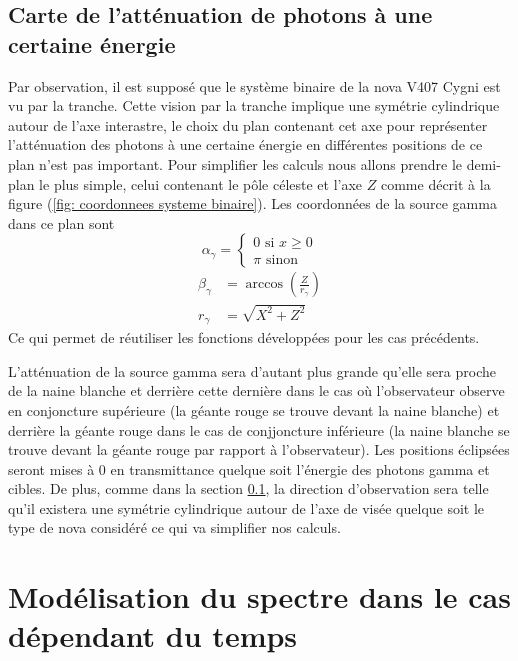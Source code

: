 \documentclass[a4paper,12pt,twoside]{article}
\begin{document}
\subsection{Carte de l'atténuation de photons à une certaine énergie}\label{sec: map}

Par observation, il est supposé que le système binaire de la nova V407 Cygni est vu par la tranche. Cette vision par la tranche implique une symétrie cylindrique autour de l'axe interastre, le choix du plan contenant cet axe pour représenter l'atténuation des photons à une certaine énergie en différentes positions de ce plan n'est pas important. Pour simplifier les calculs nous allons prendre le demi-plan le plus simple, celui contenant le pôle céleste et l'axe $Z$ comme décrit à la figure (\ref{fig: coordonnees systeme binaire}). Les coordonnées de la source gamma dans ce plan sont
\begin{equation*}
	\alpha_\gamma =
    \left\{
    \begin{array}{l}
    	0 \text{ si } x \geq 0\\
        \pi \text{ sinon}
    \end{array}
    \right.
\end{equation*}
\begin{align*}
	\beta_\gamma &= \arccos\left(\frac{Z}{r_\gamma} \right)\\
    r_\gamma &= \sqrt{X^2 + Z^2}
\end{align*}
Ce qui permet de réutiliser les fonctions développées pour les cas précédents.

L'atténuation de la source gamma sera d'autant plus grande qu'elle sera proche de la naine blanche et derrière cette dernière dans le cas où l'observateur observe en conjoncture supérieure (la géante rouge se trouve devant la naine blanche) et derrière la géante rouge dans le cas de conjjoncture inférieure (la naine blanche se trouve devant la géante rouge par rapport à l'observateur). Les positions éclipsées seront mises à $0$ en transmittance quelque soit l'énergie des photons gamma et cibles. De plus, comme dans la section \ref{sec: map}, la direction d'observation sera telle qu'il existera une symétrie cylindrique autour de l'axe de visée quelque soit le type de nova considéré ce qui va simplifier nos calculs.

\section{Modélisation du spectre dans le cas dépendant du temps}\label{sec: choc en progression}\label{sec: temps}
\end{document}
